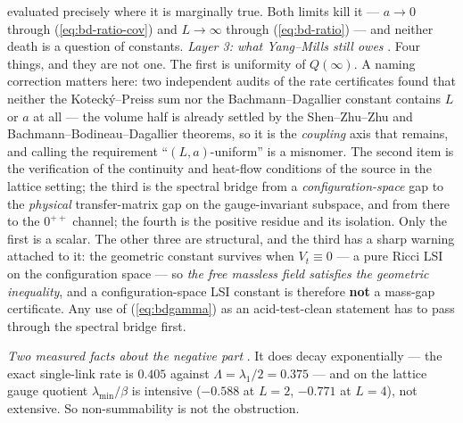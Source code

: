 evaluated precisely where it is marginally true. Both limits kill it --- $a\to0$ through
(\ref{eq:bd-ratio-cov}) and $L\to\infty$ through (\ref{eq:bd-ratio}) --- and neither death is a
question of constants.
\emph{Layer 3: what Yang--Mills still owes} \LM. Four things, and they are not one. The first is
uniformity of $Q(\infty)$. A naming correction matters here: two independent audits of the rate
certificates found that neither the Koteck\'y--Preiss sum nor the Bachmann--Dagallier constant
contains $L$ or $a$ at all --- the volume half is already settled by the Shen--Zhu--Zhu and
Bachmann--Bodineau--Dagallier theorems, so it is the \emph{coupling} axis that remains, and calling
the requirement ``$(L,a)$-uniform'' is a misnomer. The second item is the verification of the
continuity and heat-flow conditions of the source in the lattice setting; the third is the spectral
bridge from a
\emph{configuration-space} gap to the \emph{physical} transfer-matrix gap on the gauge-invariant
subspace, and from there to the $0^{++}$ channel; the fourth is the positive residue and its
isolation. Only the first is a scalar. The other three are structural, and the third has a sharp
warning attached to it: the geometric constant survives when $V_t\equiv0$ --- a pure Ricci LSI on the
configuration space --- so \emph{the free massless field satisfies the geometric inequality}, and a
configuration-space LSI constant is therefore \textbf{not} a mass-gap certificate. Any use of
(\ref{eq:bdgamma}) as an acid-test-clean statement has to pass through the spectral bridge first.

\emph{Two measured facts about the negative part} \LE. It does decay exponentially --- the exact
single-link rate is $0.405$ against $\Lambda=\lambda_1/2=0.375$ --- and on the lattice gauge quotient
$\lambda_{\min}/\beta$ is intensive ($-0.588$ at $L=2$, $-0.771$ at $L=4$), not extensive. So
non-summability is not the obstruction.

